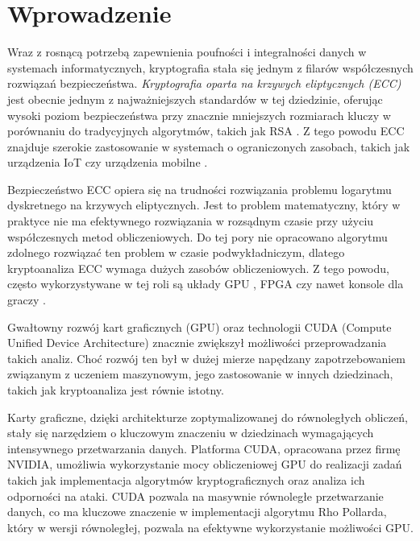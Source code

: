 \newpage

\newpage

\section{Wprowadzenie}

Wraz z rosnącą potrzebą zapewnienia poufności i integralności danych w systemach
informatycznych, kryptografia stała się jednym z filarów współczesnych rozwiązań
bezpieczeństwa. \textit{Kryptografia oparta na krzywych eliptycznych (ECC)} jest
obecnie jednym z najważniejszych standardów w tej dziedzinie, oferując wysoki
poziom bezpieczeństwa przy znacznie mniejszych rozmiarach kluczy w porównaniu
do tradycyjnych algorytmów, takich jak RSA \cite[]{Ao2016,Barker2016}.
Z tego powodu ECC znajduje szerokie zastosowanie w systemach o ograniczonych zasobach, takich
jak urządzenia IoT czy urządzenia mobilne \cite[]{Thakur2022,Hammi2020}.

Bezpieczeństwo ECC opiera się na trudności rozwiązania problemu logarytmu
dyskretnego na krzywych eliptycznych. Jest to problem matematyczny, który w
praktyce nie ma efektywnego rozwiązania w rozsądnym czasie przy użyciu
współczesnych metod obliczeniowych. Do tej pory nie opracowano algorytmu
zdolnego rozwiązać ten problem w czasie podwykładniczym, dlatego
kryptoanaliza ECC wymaga dużych zasobów obliczeniowych.
Z tego powodu, często wykorzystywane w tej roli są układy GPU \cite[]{Boss2015,Panetta2017,Bernstein2012},
FPGA \cite[]{Wenger2014,Mane2011,FPGA2008,Majkowski2008}
czy nawet konsole dla graczy \cite{Bos2010}.

Gwałtowny rozwój kart graficznych (GPU) oraz technologii CUDA
(Compute Unified Device Architecture) znacznie zwiększył możliwości
przeprowadzania takich analiz. Choć rozwój ten był w dużej mierze napędzany
zapotrzebowaniem związanym z uczeniem maszynowym, jego zastosowanie w
innych dziedzinach, takich jak kryptoanaliza jest równie istotny.

Karty graficzne, dzięki architekturze zoptymalizowanej do równoległych obliczeń,
stały się narzędziem o kluczowym znaczeniu w dziedzinach wymagających intensywnego
przetwarzania danych. Platforma CUDA, opracowana przez firmę NVIDIA, umożliwia
wykorzystanie mocy obliczeniowej GPU do realizacji zadań takich jak
implementacja algorytmów kryptograficznych oraz analiza ich odporności na ataki.
CUDA pozwala na masywnie równoległe przetwarzanie danych, co ma kluczowe znaczenie
w implementacji algorytmu Rho Pollarda, który w wersji równoległej, pozwala na efektywne
wykorzystanie możliwości GPU.

